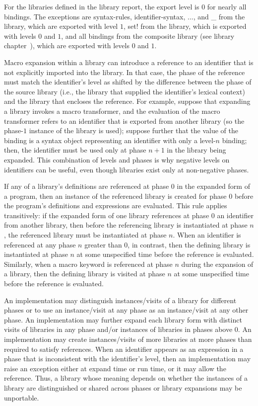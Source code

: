 For the libraries defined in the library report, the export level is
$0$ for nearly all bindings. The exceptions are {\cf syntax-rules},
{\cf identifier-syntax}, {\cf ...}, and {\cf \_} from the
 library, which are exported with level $1$, {\cf
  set!} from the  library, which is exported with
levels $0$ and $1$, and all bindings from the composite
\thersixlibrary{} library (see library
chapter~), which are
exported with levels $0$ and $1$.

Macro expansion within a library can introduce a reference to an
identifier that is not explicitly imported into the library. In that
case, the phase of the reference must match the identifier's level as
shifted by the difference between the phase of the source library
(i.e., the library that supplied the identifier's lexical context) and
the library that encloses the reference. For example, suppose that
expanding a library invokes a macro transformer, and the evaluation of
the macro transformer refers to an identifier that is exported from
another library (so the phase-$1$ instance of the library is used);
suppose further that the value of the binding is a syntax object
representing an identifier with only a level-$n$ binding; then, the
identifier must be used only at phase $n+1$ in the
library being expanded. This combination of levels and phases is why
negative levels on identifiers can be useful, even though libraries
exist only at non-negative phases.

If any of a library's definitions are referenced at phase $0$ in the
expanded form of a program, then an instance of the referenced library
is created for phase $0$ before the program's definitions and
expressions are evaluated. This rule applies transitively: if the
expanded form of one library references at phase $0$ an identifier
from another library, then before the referencing library is
instantiated at phase $n$, the referenced library must be instantiated
at phase $n$. When an identifier is referenced at any phase $n$
greater than $0$, in contrast, then the defining library is
instantiated at phase $n$ at some unspecified time before the
reference is evaluated. Similarly, when a macro keyword is referenced at
phase $n$ during the expansion of a library, then the
defining library is visited at phase $n$ at some unspecified time
before the reference is evaluated.

An implementation may distinguish instances/visits of a library for
different phases or to use an instance/visit at any phase as an instance/visit at
any other phase. An implementation may further
expand each {\cf library} form with distinct
visits of libraries in any phase and/or instances of
libraries in phases above $0$. An implementation may
create instances/visits of more libraries at more phases than required to
satisfy references. When an identifier appears as an expression in a
phase that is inconsistent with the identifier's level, then an
implementation may raise an exception either at expand time or run
time, or it may allow the reference. Thus, a library whose meaning depends on whether the
instances of a library are distinguished or shared across phases or
{\cf library} expansions may be unportable.

